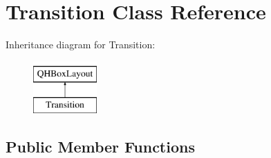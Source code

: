 \hypertarget{class_transition}{}\section{Transition Class Reference}
\label{class_transition}
Inheritance diagram for Transition\+:\begin{figure}[H]
\begin{center}
\leavevmode
\includegraphics[height=2.000000cm]{class_transition}
\end{center}
\end{figure}
\subsection*{Public Member Functions}
